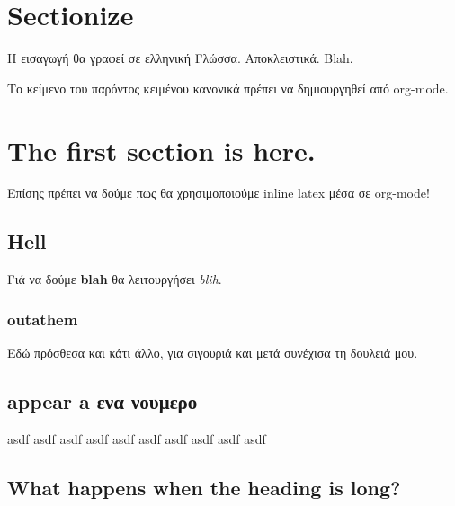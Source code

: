 \section{Sectionize}
\label{sec:org110ed31}
Η εισαγωγή θα γραφεί σε ελληνική Γλώσσα. Αποκλειστικά. Blah.

Το κείμενο του παρόντος κειμένου κανονικά πρέπει να δημιουργηθεί από org-mode.
\section{The first section is here.}
\label{sec:orgc40516e}
Επίσης πρέπει να δούμε πως θα χρησιμοποιούμε inline latex μέσα σε org-mode!
\subsection{Hell}
\label{sec:orgb216ad6}
Γιά να δούμε \textbf{blah} θα λειτουργήσει \emph{blih}.
\subsubsection{outathem}
\label{sec:org3c1b80a}
Εδώ πρόσθεσα και κάτι άλλο, για σιγουριά και μετά συνέχισα τη δουλειά μου.
\subsection{appear a ενα νουμερο}
\label{sec:org4094001}

asdf asdf asdf asdf asdf asdf asdf asdf asdf asdf
\subsection{What happens when the heading is long?}
\label{sec:orga188ca3}

